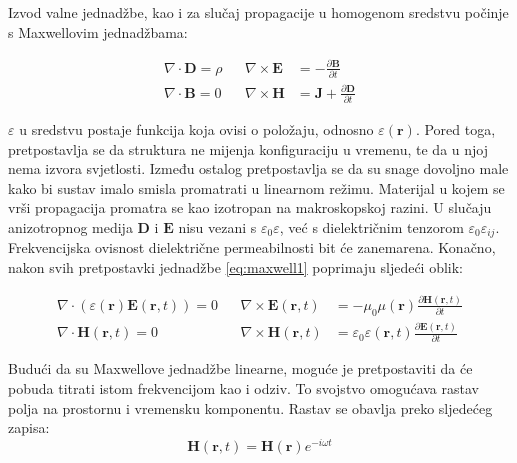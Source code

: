 \documentclass[utf8, seminar]{fer}
\begin{document}
Izvod valne jednadžbe, kao i za slučaj propagacije u homogenom sredstvu počinje
s Maxwellovim jednadžbama:

\begin{align} \label{eq:maxwell1}
	\nabla \cdot \mathbf{D} = \rho &&
	\nabla \times \mathbf{E} &=
		- \frac{\partial \mathbf{B}}{\partial t}  \nonumber \\
	\nabla \cdot \mathbf{B} = 0 &&
	\nabla \times \mathbf{H} &=
		\mathbf{J} + \frac{\partial \mathbf{D}}{\partial t}
\end{align}

$\varepsilon$ u sredstvu postaje funkcija koja ovisi o položaju, odnosno
$\varepsilon(\mathbf{r})$. Pored toga, pretpostavlja se da struktura ne mijenja
konfiguraciju u vremenu, te da u njoj nema izvora svjetlosti. Između ostalog
pretpostavlja se da su snage dovoljno male kako bi sustav imalo smisla promatrati
u linearnom režimu.
Materijal u kojem se vrši propagacija promatra se kao izotropan na makroskopskoj
razini. U slučaju anizotropnog medija $\mathbf{D}$ i $\mathbf{E}$ nisu vezani
s $\varepsilon_0 \varepsilon$, već s
dielektričnim tenzorom $\varepsilon_0 \varepsilon_{ij}$. Frekvencijska
ovisnost dielektrične permeabilnosti bit će zanemarena. Konačno, nakon svih
pretpostavki jednadžbe \ref{eq:maxwell1} poprimaju sljedeći oblik:

\begin{align} \label{eq:maxwell2}
	\nabla \cdot (\varepsilon(\mathbf{r}) \mathbf{E}(\mathbf{r}, t)) = 0 &&
	\nabla \times \mathbf{E}(\mathbf{r}, t) &=
		- \mu_0 \mu(\mathbf{r})
		\frac{\partial \mathbf{H}(\mathbf{r}, t)}{\partial t}  \nonumber \\
	\nabla \cdot \mathbf{H}(\mathbf{r}, t) = 0 &&
	\nabla \times \mathbf{H}(\mathbf{r}, t) &=
		\varepsilon_0 \varepsilon(\mathbf{r}, t)
		\frac{\partial \mathbf{E}(\mathbf{r}, t)}{\partial t}
\end{align}

Budući da su Maxwellove jednadžbe linearne, moguće je pretpostaviti da će pobuda
titrati istom frekvencijom kao i odziv. To svojstvo omogućava rastav polja
na prostornu i vremensku komponentu. Rastav se obavlja preko sljedećeg zapisa:
\begin{equation} \label{eq:harmonic}
	\mathbf{H}(\mathbf{r}, t) = \mathbf{H}(\mathbf{r}) e^{-i \omega t}
\end{equation}
\end{document}
